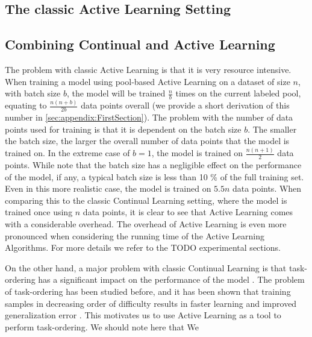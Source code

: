 \subsection{The classic Active Learning Setting}
\label{sec:Methodology:ALSetting}

\subsection{Combining Continual and Active Learning}
\label{sec:Methodology:CombiningCLandAL}
The problem with classic Active Learning is that it is very resource intensive. When training a model using pool-based Active Learning on a dataset of size $n$,
with batch size $b$, the model will be trained $\frac{n}{b}$ times on the current labeled pool, equating to $\frac{n(n+b)}{2b}$ data points overall (we provide a
short derivation of this number in \ref{sec:appendix:FirstSection}). The problem with the number of data points used for training is that it is dependent on the
batch size $b$. The smaller the batch size, the larger the overall number of data points that the model is trained on. In the extreme case of $b=1$, the model
is trained on $\frac{n(n+1)}{2}$ data points. While \cite{beck2021effective} note that the batch size has a negligible effect on the performance of the model,
if any, a typical batch size is less than 10 \% of the full training set. Even in this more realistic case, the model is trained on $5.5n$ data points. When
comparing this to the classic Continual Learning setting, where the model is trained once using $n$ data points, it is clear to see that Active Learning comes
with a considerable overhead. The overhead of Active Learning is even more pronounced when considering the running time of the Active Learning Algorithms.
For more details we refer to the TODO experimental sections. \par
On the other hand, a major problem with classic Continual Learning is that task-ordering has a significant impact on the performance of the model \cite{bell2022effect}.
The problem of task-ordering has been studied before, and it has been shown that training samples in decreasing order of difficulty results in faster learning and 
improved generalization error \cite{hacohen2019power}. This motivates us to use Active Learning as a tool to perform task-ordering. We should note here that We
